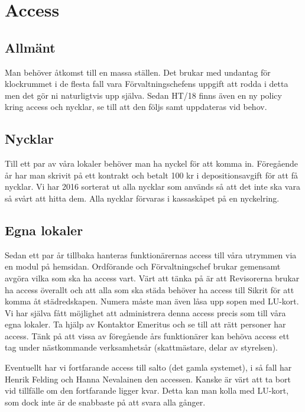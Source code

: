 \documentclass[10pt]{article}
\begin{document}
    \section{Access}
    
    \subsection{Allmänt}
    
    Man behöver åtkomst till en massa ställen. Det brukar med undantag för klockrummet i de flesta fall vara Förvaltningschefens uppgift att rodda i detta men det gör ni naturligtvis upp själva. Sedan HT/18 finns även en ny policy kring access och nycklar, se till att den följs samt uppdateras vid behov.
    
    \subsection{Nycklar}
    
    Till ett par av våra lokaler behöver man ha nyckel för att komma in. Föregående år har man skrivit på ett kontrakt och betalt 100 kr i depositionsavgift för att få nycklar. Vi har 2016 sorterat ut alla nycklar som används så att det inte ska vara så svårt att hitta dem. Alla nycklar förvaras i kassaskåpet på en nyckelring.
     
    \subsection{Egna lokaler}
    
    Sedan ett par år tillbaka hanteras funktionärernas access till våra utrymmen via en modul på hemsidan. Ordförande och Förvaltningschef brukar gemensamt avgöra vilka som ska ha access vart. Värt att tänka på är att Revisorerna brukar ha access överallt och att alla som ska städa behöver ha access till Sikrit för att komma åt städredskapen. Numera måste man även låsa upp sopen med LU-kort. Vi har själva fått möjlighet att administrera denna access precis som till våra egna lokaler. Ta hjälp av Kontaktor Emeritus och se till att rätt personer har access. Tänk på att vissa av föregående års funktionärer kan behöva access ett tag under nästkommande verksamhetsår (skattmästare, delar av styrelsen).
    
    Eventuellt har vi fortfarande access till salto (det gamla systemet), i så fall har Henrik Felding och Hanna Nevalainen den accessen. Kanske är värt att ta bort vid tillfälle om den fortfarande ligger kvar. Detta kan man kolla med LU-kort, som dock inte är de snabbaste på att svara alla gånger.
    
\end{document}
